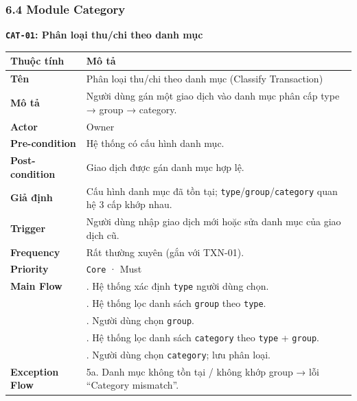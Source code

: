 \documentclass[11pt,a4paper]{article}
\newcounter{none}
\begin{document}
\subsubsection{6.4 Module Category}\label{module-category}

\textbf{\texttt{CAT-01}: Phân loại thu/chi theo danh mục}

{\def\LTcaptype{none}
\begin{longtable}[]{@{}
  >{\raggedright\arraybackslash}p{}
  >{\raggedright\arraybackslash}p{}@{}}
\toprule\noalign{}
\begin{minipage}[b]{\linewidth}\raggedright
Thuộc tính
\end{minipage} & \begin{minipage}[b]{\linewidth}\raggedright
Mô tả
\end{minipage} \\
\midrule\noalign{}
\endhead
\bottomrule\noalign{}
\endlastfoot
\textbf{Tên} & Phân loại thu/chi theo danh mục (Classify Transaction) \\ 
\textbf{Mô tả} & Người dùng gán một giao dịch vào danh mục phân cấp type → group → category. \\ 
\textbf{Actor} & Owner \\ 
\textbf{Pre-condition} & Hệ thống có cấu hình danh mục. \\ 
\textbf{Post-condition} & Giao dịch được gán danh mục hợp lệ. \\ 
\textbf{Giả định} & Cấu hình danh mục đã tồn tại; \texttt{type}/\texttt{group}/\texttt{category} quan hệ 3 cấp khớp nhau. \\ 
\textbf{Trigger} & Người dùng nhập giao dịch mới hoặc sửa danh mục của giao dịch cũ. \\ 
\textbf{Frequency} & Rất thường xuyên (gắn với TXN-01). \\ 
\textbf{Priority} & \texttt{Core} · Must \\ 
\textbf{Main Flow} & 1. Hệ thống xác định \texttt{type} người dùng chọn.\\
&2. Hệ thống lọc danh sách \texttt{group} theo \texttt{type}.\\
&3. Người dùng chọn \texttt{group}.\\
&4. Hệ thống lọc danh sách \texttt{category} theo \texttt{type} + \texttt{group}.\\
&5. Người dùng chọn \texttt{category}; lưu phân loại. \\ 
\textbf{Exception Flow} & 5a. Danh mục không tồn tại / không khớp group → lỗi ``Category mismatch''. \\
\end{longtable}
}
\end{document}
